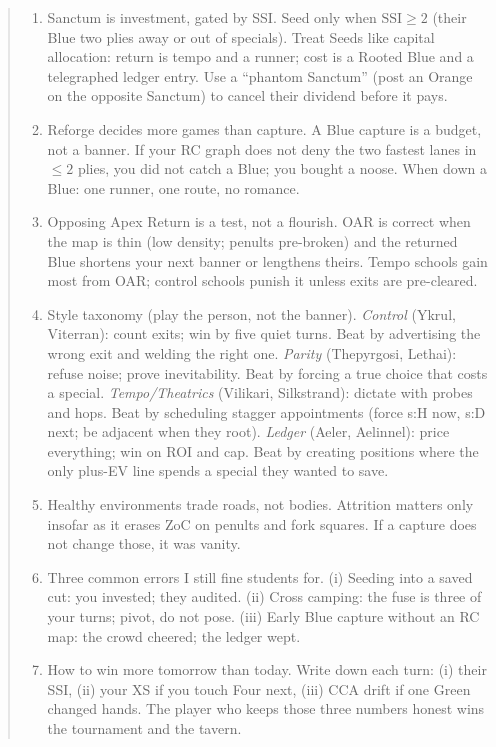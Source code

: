 \documentclass[11pt]{article}
\begin{document}
\begin{quote}
\begin{tcolorbox}[enhanced,breakable,
  colback=royal!3, colframe=royal!70!black, boxrule=0.6pt,
  title={Fenwood’s Memorandum on the Canray Theory}]
\begin{enumerate}[leftmargin=*,itemsep=0.5em,label=\textbf{Thesis \Roman*.}]
\item Sanctum is investment, gated by SSI. Seed only when $\mathrm{SSI}\ge 2$ (their Blue two plies away or out of specials). Treat Seeds like capital allocation: return is tempo and a runner; cost is a Rooted Blue and a telegraphed ledger entry. Use a “phantom Sanctum” (post an Orange on the opposite Sanctum) to cancel their dividend before it pays.

\item Reforge decides more games than capture. A Blue capture is a budget, not a banner. If your RC graph does not deny the two fastest lanes in $\le 2$ plies, you did not catch a Blue; you bought a noose. When down a Blue: one runner, one route, no romance.

\item Opposing Apex Return is a test, not a flourish. OAR is correct when the map is thin (low density; penults pre-broken) and the returned Blue shortens your next banner or lengthens theirs. Tempo schools gain most from OAR; control schools punish it unless exits are pre-cleared.

\item Style taxonomy (play the person, not the banner).
\emph{Control} (Ykrul, Viterran): count exits; win by five quiet turns. Beat by advertising the wrong exit and welding the right one.
\emph{Parity} (Thepyrgosi, Lethai): refuse noise; prove inevitability. Beat by forcing a true choice that costs a special.
\emph{Tempo/Theatrics} (Vilikari, Silkstrand): dictate with probes and hops. Beat by scheduling stagger appointments (force s{:}H now, s{:}D next; be adjacent when they root).
\emph{Ledger} (Aeler, Aelinnel): price everything; win on ROI and cap. Beat by creating positions where the only plus-EV line spends a special they wanted to save.

\item Healthy environments trade roads, not bodies. Attrition matters only insofar as it erases ZoC on penults and fork squares. If a capture does not change those, it was vanity.

\item Three common errors I still fine students for.
(i) Seeding into a saved cut: you invested; they audited.
(ii) Cross camping: the fuse is three of your turns; pivot, do not pose.
(iii) Early Blue capture without an RC map: the crowd cheered; the ledger wept.

\item How to win more tomorrow than today. Write down each turn: (i) their SSI, (ii) your XS if you touch Four next, (iii) CCA drift if one Green changed hands. The player who keeps those three numbers honest wins the tournament and the tavern.


\end{enumerate}
\end{tcolorbox}
\end{quote}
\end{document}
